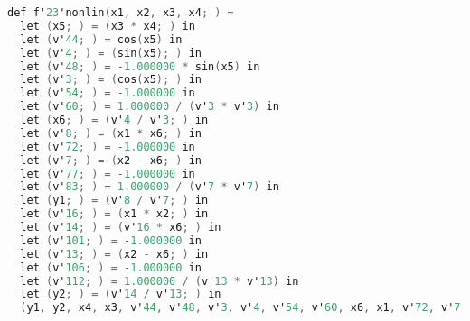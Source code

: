 \documentclass[a4paper, french, 11pt]{article}
\begin{document}
\begin{lstlisting}[style=myStyle, language=C]
def f'23'nonlin(x1, x2, x3, x4; ) = 
  let (x5; ) = (x3 * x4; ) in 
  let (v'44; ) = cos(x5) in 
  let (v'4; ) = (sin(x5); ) in 
  let (v'48; ) = -1.000000 * sin(x5) in 
  let (v'3; ) = (cos(x5); ) in 
  let (v'54; ) = -1.000000 in 
  let (v'60; ) = 1.000000 / (v'3 * v'3) in 
  let (x6; ) = (v'4 / v'3; ) in 
  let (v'8; ) = (x1 * x6; ) in 
  let (v'72; ) = -1.000000 in 
  let (v'7; ) = (x2 - x6; ) in 
  let (v'77; ) = -1.000000 in 
  let (v'83; ) = 1.000000 / (v'7 * v'7) in 
  let (y1; ) = (v'8 / v'7; ) in 
  let (v'16; ) = (x1 * x2; ) in 
  let (v'14; ) = (v'16 * x6; ) in 
  let (v'101; ) = -1.000000 in 
  let (v'13; ) = (x2 - x6; ) in 
  let (v'106; ) = -1.000000 in 
  let (v'112; ) = 1.000000 / (v'13 * v'13) in 
  let (y2; ) = (v'14 / v'13; ) in 
  (y1, y2, x4, x3, v'44, v'48, v'3, v'4, v'54, v'60, x6, x1, v'72, v'7, v'8, v'77, v'83, x2, v'16, v'101, v'13, v'14, v'106, v'112; )


\end{lstlisting}
\end{document}
